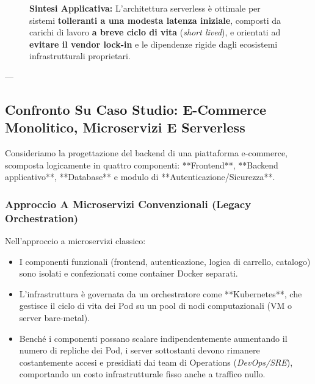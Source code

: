 \documentclass[11pt, a4paper]{article}
\begin{document}
\begin{figure}[H]
\centering
\colorbox{yellow!25}{
\parbox{0.92\textwidth}{
\centering\vspace{3pt}
\textbf{Sintesi Applicativa:} L'architettura serverless è ottimale per sistemi \textbf{tolleranti a una modesta latenza iniziale}, composti da carichi di lavoro \textbf{a breve ciclo di vita} (\emph{short lived}), e orientati ad \textbf{evitare il vendor lock-in} e le dipendenze rigide dagli ecosistemi infrastrutturali proprietari.\vspace{3pt}
}
}
\end{figure}

---

\subsection{Confronto Su Caso Studio: E-Commerce Monolitico, Microservizi E Serverless}

Consideriamo la progettazione del backend di una piattaforma e-commerce, scomposta logicamente in quattro componenti: **Frontend**, **Backend applicativo**, **Database** e modulo di **Autenticazione/Sicurezza**.


\subsubsection{Approccio A Microservizi Convenzionali (Legacy Orchestration)}
Nell'approccio a microservizi classico:
\begin{itemize}[noitemsep]
    \item I componenti funzionali (frontend, autenticazione, logica di carrello, catalogo) sono isolati e confezionati come container Docker separati.
    \item L'infrastruttura è governata da un orchestratore come **Kubernetes**, che gestisce il ciclo di vita dei Pod su un pool di nodi computazionali (VM o server bare-metal).
    \item Benché i componenti possano scalare indipendentemente aumentando il numero di repliche dei Pod, i server sottostanti devono rimanere costantemente accesi e presidiati dai team di Operations (\emph{DevOps/SRE}), comportando un costo infrastrutturale fisso anche a traffico nullo.
\end{itemize}
\end{document}
